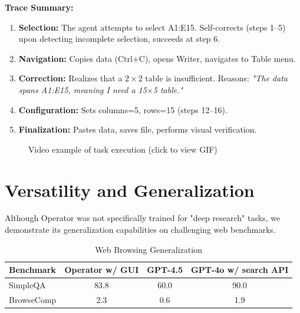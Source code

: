 \documentclass[11pt, a4paper]{article}
\newcommand{\modelname}{Operator}
\begin{document}
\noindent\textbf{Trace Summary:}
\begin{enumerate}
    \item \textbf{Selection:} The agent attempts to select A1:E15. Self-corrects (steps 1--5) upon detecting incomplete selection, succeeds at step 6.
    \item \textbf{Navigation:} Copies data (Ctrl+C), opens Writer, navigates to Table menu.
    \item \textbf{Correction:} Realizes that a $2\times2$ table is insufficient. Reasons: \textit{"The data spans A1:E15, meaning I need a 15$\times$5 table."}
    \item \textbf{Configuration:} Sets columns=5, rows=15 (steps 12--16).
    \item \textbf{Finalization:} Pastes data, saves file, performs visual verification.
\end{enumerate}

\begin{figure}[H]
    \centering
    \caption{Video example of task execution (click to view GIF)}
    \label{fig:demo}
\end{figure}

\section{Versatility and Generalization}
Although \modelname{} was not specifically trained for "deep research" tasks, we demonstrate its generalization capabilities on challenging web benchmarks.

\begin{table}[H]
    \centering
    \caption{Web Browsing Generalization}
    \begin{tabular}{lccc}
        \toprule
        \textbf{Benchmark} & \textbf{\modelname{} w/ GUI} & \textbf{GPT-4.5} & \textbf{GPT-4o w/ search API} \\
        \midrule
        SimpleQA & 83.8 & 60.0 & 90.0 \\
        BrowseComp & 2.3 & 0.6 & 1.9 \\
        \bottomrule
    \end{tabular}
\end{table}
\end{document}
